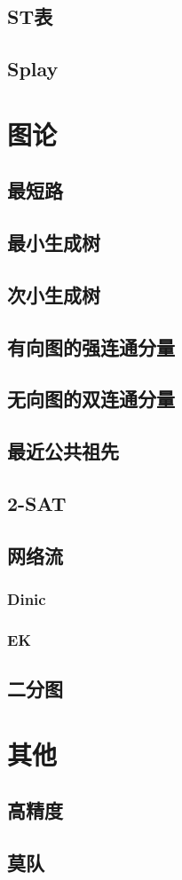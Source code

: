 \documentclass[10pt,a4paper]{article}
\begin{document}
\subsection{ST表}

\subsection{Splay}

\section{图论}
\subsection{最短路}
\subsection{最小生成树}
\subsection{次小生成树}
\subsection{有向图的强连通分量}
\subsection{无向图的双连通分量}
\subsection{最近公共祖先}
\subsection{2-SAT}
\subsection{网络流}
\subsubsection{Dinic}
\begin{spacing}{1.5}

\end{spacing}

\subsubsection{EK}

\subsection{二分图}
\section{其他}
\subsection{高精度}

\subsection{莫队}
\end{document}
